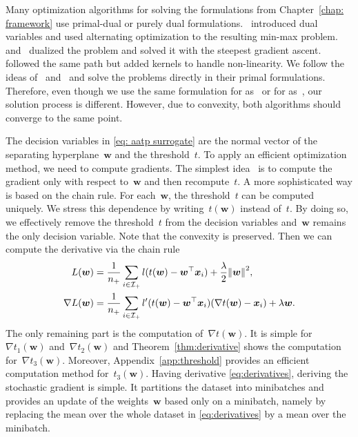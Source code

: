 Many optimization algorithms for solving the formulations from Chapter~\ref{chap: framework} use primal-dual or purely dual formulations.~\cite{eban2017scalable} introduced dual variables and used alternating optimization to the resulting min-max problem. ~\cite{li2014top} and~\cite{zhang2018tau} dualized the problem and solved it with the steepest gradient ascent.~\cite{macha2020nonlinear} followed the same path but added kernels to handle non-linearity. We follow the ideas of~\cite{mackey2018constrained} and~\cite{adam2019machine} and solve the problems directly in their primal formulations. Therefore, even though we use the same formulation for \TopPush as~\cite{li2014top} or for \tauFPL as~\cite{zhang2018tau}, our solution process is different. However, due to convexity, both algorithms should converge to the same point.

The decision variables in \eqref{eq: aatp surrogate} are the normal vector of the separating hyperplane~$\bm{w}$ and the threshold~$t$. To apply an efficient optimization method, we need to compute gradients. The simplest idea~\cite{grill2016learning} is to compute the gradient only with respect to~$\bm{w}$ and then recompute~$t$. A more sophisticated way is based on the chain rule. For each~$\bm{w}$, the threshold~$t$ can be computed uniquely. We stress this dependence by writing~$t(\bm{w})$ instead of~$t$. By doing so, we effectively remove the threshold~$t$ from the decision variables and~$\bm{w}$ remains the only decision variable. Note that the convexity is preserved. Then we can compute the derivative via the chain rule
\begin{equation}\label{eq:derivatives}
  \begin{aligned}
  L(\bm{w})
    & = \frac{1}{\npos} \sum_{i \in \Ipos} l(t(\bm{w}) - \bm{w}^{\top} \bm{x}_i) + \frac{\lambda}{2}\norm{\bm{w}}^2, \\
  \nabla L(\bm{w})
    & = \frac{1}{\npos} \sum_{i \in \Ipos} l'(t(\bm{w}) - \bm{w}^{\top} \bm{x}_i)(\nabla t(\bm{w}) - \bm{x}_i) + \lambda \bm{w}.
  \end{aligned}
\end{equation}
The only remaining part is the computation of~$\nabla t(\bm{w})$. It is simple for~$\nabla t_1(\bm{w})$ and~$\nabla t_2(\bm{w})$ and Theorem~\ref{thm:derivative} shows the computation for~$\nabla t_3(\bm{w})$. Moreover, Appendix~\ref{app:threshold} provides an efficient computation method for~$t_3(\bm{w})$. Having derivative \eqref{eq:derivatives}, deriving the stochastic gradient is simple. It partitions the dataset into minibatches and provides an update of the weights~$\bm{w}$ based only on a minibatch, namely by replacing the mean over the whole dataset in \eqref{eq:derivatives} by a mean over the minibatch.

